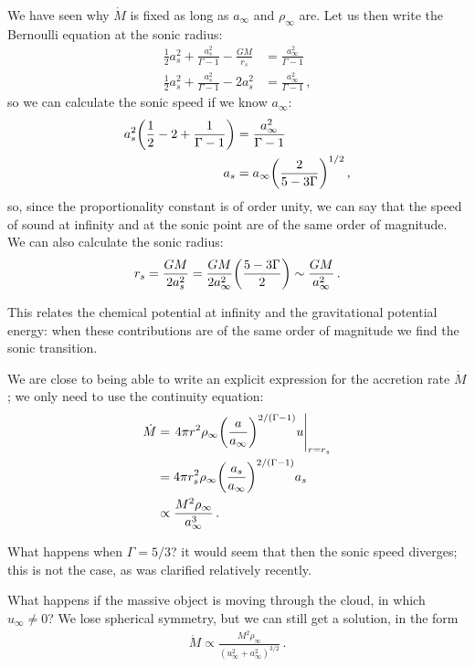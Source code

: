 \documentclass[main.tex]{subfiles}
\begin{document}

We have seen why \(\dot{M}\) is fixed as long as \(a_\infty \) and \(\rho _\infty \) are.
Let us then write the Bernoulli equation at the sonic radius: 
%
\begin{align}
\frac{1}{2} a_s^2 + \frac{a_s^2}{\Gamma -1} - \frac{GM}{r_s} &= \frac{a_\infty^2}{\Gamma -1}  \\
\frac{1}{2} a_s^2 + \frac{a_s^2}{\Gamma -1} -2 a_s^2 &= \frac{a_\infty^2}{\Gamma -1}
\,,
\end{align}
%
so we can calculate the sonic speed if we know \(a_\infty\): 
%
\begin{align}
a_s^2 \qty( \frac{1}{2} - 2 + \frac{1}{\Gamma -1}) &= \frac{a_\infty^2 }{\Gamma -1}  \\
a_s &= a_\infty \qty( \frac{2}{5 - 3 \Gamma })^{1/2}
\,,
\end{align}
%
so, since the proportionality constant is of order unity, we can say that the speed of sound at infinity and at the sonic point are of the same order of magnitude. 
We can also calculate the sonic radius: 
%
\begin{align}
r_s = \frac{GM}{2 a_s^2} = \frac{GM}{2 a_\infty^2} \qty(\frac{5 - 3 \Gamma }{2}) \sim \frac{GM}{a_\infty^2}
\,.
\end{align}

This relates the chemical potential at infinity and the gravitational potential energy: when these contributions are of the same order of magnitude we find the sonic transition. 

We are close to being able to write an explicit expression for the accretion rate \(\dot{M}\); we only need to use the continuity equation: 
%
\begin{align}
\dot{M} &= \eval{4 \pi r^2 \rho_\infty \qty( \frac{a}{a_\infty })^{2 / (\Gamma -1)} u  }_{r = r_s}  \\
&= 4 \pi r_s^2 \rho _\infty \qty(\frac{a_s}{a_\infty })^{2 / (\Gamma -1)} a_s  \\
&\propto \frac{M^2 \rho _\infty }{a_\infty^3}
\,.
\end{align}

What happens when \(\Gamma = 5/3\)? it would seem that then the sonic speed diverges; this is not the case, as was clarified relatively recently. 

What happens if the massive object is moving through the cloud, in which \(u_\infty \neq 0\)? We lose spherical symmetry, but we can still get a solution, in the form 
%
\begin{align}
\dot{M} \propto \frac{M^2 \rho _\infty }{(u_\infty^2 + a_\infty^2)^{3/2}}
\,.
\end{align}
\end{document}
